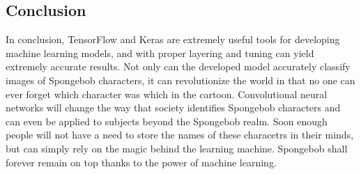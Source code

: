 \documentclass{article}
\begin{document}
\begin{multicols}{2}
\section{Conclusion}
{\quad
In conclusion, TensorFlow and Keras are extremely useful tools for developing machine learning models, and with proper layering and tuning can yield extremely accurate results. Not only can the developed model accurately classify images of Spongebob characters, it can revolutionize the world in that no one can ever forget which character was which in the cartoon. Convolutional neural networks will change the way that society identifies Spongebob characters and can even be applied to subjects beyond the Spongebob realm. Soon enough people will not have a need to store the names of these characetrs in their minds, but can simply rely on the magic behind the learning machine. Spongebob shall forever remain on top thanks to the power of machine learning. 
}

\end{multicols}


  
\end{document}
